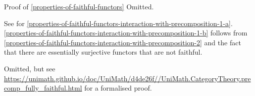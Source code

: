 \begin{Proof}{Proof of \cref{properties-of-faithful-functors}}%
    Omitted.

    See \cite{MSE733163} for \cref{properties-of-faithful-functors-interaction-with-precomposition-1-a}. \cref{properties-of-faithful-functors-interaction-with-precomposition-1-b} follows from \cref{properties-of-faithful-functors-interaction-with-precomposition-2} and the fact that there are essentially surjective functors that are not faithful.

    Omitted, but see \url{https://unimath.github.io/doc/UniMath/d4de26f//UniMath.CategoryTheory.precomp\_fully\_faithful.html} for a formalised proof.


\end{Proof}
